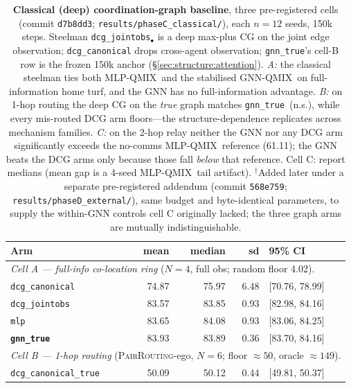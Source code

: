 \documentclass[10pt]{article}
\newcommand{\algoname}[1]{\textsc{#1}}
\newcommand{\gnnqmix}{\algoname{GNN-QMIX}}
\newcommand{\mlpqmix}{\algoname{MLP-QMIX}}
\newcommand{\gtrue}{\texttt{gnn\_true}}
\newcommand{\pairrouting}{\textsc{PairRouting}}
\newcommand{\SCfloor}{50}             %
\newcommand{\SCoracle}{149}           %
\newcommand{\CBAfloor}{4.02}
\newcommand{\CBAgnn}{83.93}            %
\newcommand{\CBAgnnCI}{[83.70, 84.16]}
\newcommand{\CBAgnnSD}{0.36}
\newcommand{\CBAmlp}{83.65}            %
\newcommand{\CBAmlpCI}{[83.06, 84.25]}
\newcommand{\CBAmlpSD}{0.93}
\newcommand{\CBAdcg}{83.57}            %
\newcommand{\CBAdcgCI}{[82.98, 84.16]}
\newcommand{\CBAdcgSD}{0.93}
\newcommand{\CBAcanon}{74.87}          %
\newcommand{\CBAcanonCI}{[70.76, 78.99]}
\newcommand{\CBAcanonSD}{6.48}
\newcommand{\CBBcanon}{50.09}          %
\newcommand{\CBCmlp}{61.11}            %
\begin{document}
\begin{table}[t]
  \centering
  \footnotesize
  \caption{\textbf{Classical (deep) coordination-graph baseline}, three
  pre-registered cells (commit \texttt{d7b8dd3}; \texttt{results/phaseC\_classical/}),
  each $n{=}12$ seeds, 150k steps. Steelman \texttt{dcg\_jointobs}$_\bullet$ is a
  deep max-plus CG on the joint edge observation; \texttt{dcg\_canonical} drops
  cross-agent observation; \gtrue's cell-B row is the frozen 150k anchor
  (\S\ref{sec:structure:attention}). \emph{A:} the classical steelman ties both
  \mlpqmix\ and the stabilised \gnnqmix\ on full-information home turf, and the
  GNN has no full-information advantage. \emph{B:} on 1-hop routing the deep CG
  on the \emph{true} graph matches \gtrue\ (n.s.), while every mis-routed DCG
  arm floors---the structure-dependence replicates across mechanism families.
  \emph{C:} on the 2-hop relay neither the GNN nor any DCG arm significantly
  exceeds the no-comms \mlpqmix\ reference (\CBCmlp); the GNN beats the DCG arms
  only because those fall \emph{below} that reference. Cell C: report medians
  (mean gap is a 4-seed \mlpqmix\ tail artifact). $^{\dagger}$Added later under
  a separate pre-registered addendum (commit \texttt{568e759};
  \texttt{results/phaseD\_external/}), same budget and byte-identical
  parameters, to supply the within-GNN controls cell C originally lacked; the
  three graph arms are mutually indistinguishable.}
  \label{tab:classical}
  \setlength{\tabcolsep}{4pt}%
  \begin{tabular}{lrrrl}
    \toprule
    Arm & mean & median & sd & 95\% CI \\
    \midrule
    \multicolumn{5}{l}{\emph{Cell A --- full-info co-location ring} ($N{=}4$, full obs; random floor \CBAfloor).} \\
    \texttt{dcg\_canonical}     & \CBAcanon & 75.97 & \CBAcanonSD & \CBAcanonCI \\
    \texttt{dcg\_jointobs}      & \CBAdcg   & 83.85 & \CBAdcgSD    & \CBAdcgCI \\
    \texttt{mlp}                & \CBAmlp   & 84.08 & \CBAmlpSD    & \CBAmlpCI \\
    \textbf{\texttt{gnn\_true}} & \CBAgnn   & 83.89 & \CBAgnnSD    & \CBAgnnCI \\
    \midrule
    \multicolumn{5}{l}{\emph{Cell B --- 1-hop routing} (\pairrouting-ego, $N{=}6$; floor ${\approx}\SCfloor$, oracle ${\approx}\SCoracle$).} \\
    \texttt{dcg\_canonical\_true}   & \CBBcanon    & 50.12 & 0.44 & [49.81, 50.37] \\

\end{tabular}
\end{table}
\end{document}
